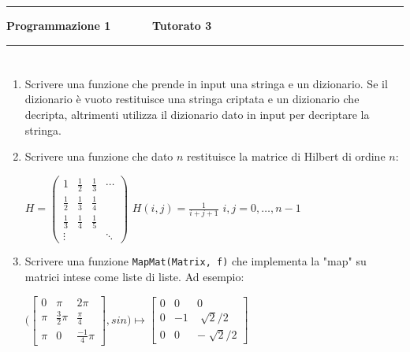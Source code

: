 \documentclass[11pt,a4]{article}
\begin{document}
\thispagestyle{empty}
\hrule
\begin{center}
   {\Large {\bf Programmazione 1 \hspace{3cm} $\quad \quad \quad$ Tutorato 3}}
\end{center}

\hrule

\section*{}

\begin{enumerate}

\item Scrivere una funzione che prende in input una stringa e un dizionario. Se il dizionario è vuoto restituisce una stringa criptata e un dizionario che decripta, altrimenti utilizza il dizionario dato in input per decriptare la stringa.


\item Scrivere una funzione che dato $n$ restituisce la matrice di Hilbert di ordine $n$:

\begin{center}
$H=\begin{pmatrix}
       1      & \frac{1}{2} & \frac{1}{3} & \cdots \\[1ex] 
  \frac{1}{2} & \frac{1}{3} & \frac{1}{4} &  \\[1ex]
  \frac{1}{3} & \frac{1}{4} & \frac{1}{5} &  \\
    \vdots    &             &             & \ddots 
\end{pmatrix}$
$H(i,j)=\frac{1}{i+j+1}$ $i,j=0,\dots,n-1$
\end{center}

\item Scrivere una funzione {\tt MapMat(Matrix, f)} che implementa la "map" su matrici intese come liste di liste. 
Ad esempio:\\
\begin{center}
$
\Bigg(
\begin{bmatrix} 
0 & \pi & 2\pi\\[4pt]
\pi & \frac{3}{2}\pi & \frac{\pi}{4} \\[4pt]
\pi & 0 & \frac{-1}{4}\pi\end{bmatrix}, sin \Bigg) \longmapsto 
\begin{bmatrix} 
0 & 0 & 0\\[4pt]
0 & -1 & \sqrt[]{2}/2 \\[4pt]
0 & 0 & -\sqrt[]{2}/2\end{bmatrix}
$
\end{center}


\end{enumerate}
\end{document}
